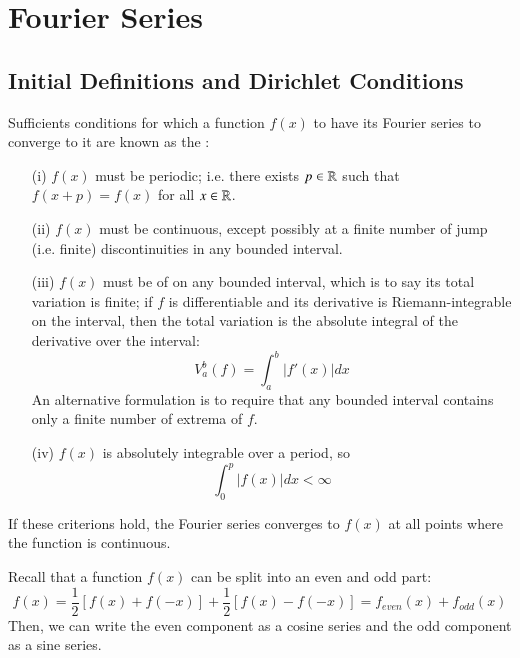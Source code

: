 \documentclass[12pt, a4paper, oneside, openright, titlepage]{book}
\begin{document}
\chapter{Fourier Series}


\section{Initial Definitions and Dirichlet Conditions}


\begin{defn}
    Sufficients conditions for which a function $f(x)$ to have its Fourier series to converge to it are known as the : \begin{enumerate}
        \item[(i)] $f(x)$ must be periodic; i.e. there exists $p \in \mathbb R$ such that $f(x+p) = f(x)$ for all $x \in \mathbb R$.
        \item[(ii)] $f(x)$ must be continuous, except possibly at a finite number of jump (i.e. finite) discontinuities in any bounded interval.
        \item[(iii)] $f(x)$ must be of  on any bounded interval, which is to say its total variation is finite; if $f$ is differentiable and its derivative is Riemann-integrable on the interval, then the total variation is the absolute integral of the derivative over the interval: $$V_a^b(f) = \int_a^b|f'(x)|dx$$
            An alternative formulation is to require that any bounded interval contains only a finite number of extrema of $f$.
        \item[(iv)] $f(x)$ is absolutely integrable over a period, so $$\int_0^p|f(x)|dx < \infty$$
    \end{enumerate}
    If these criterions hold, the Fourier series converges to $f(x)$ at all points where the function is continuous.
\end{defn}

Recall that a function $f(x)$ can be split into an even and odd part: \begin{equation*}
    f(x) = \frac{1}{2}[f(x) + f(-x)] + \frac{1}{2}[f(x) - f(-x)] = f_{even}(x) + f_{odd}(x)
\end{equation*}
Then, we can write the even component as a cosine series and the odd component as a sine series.
\end{document}
